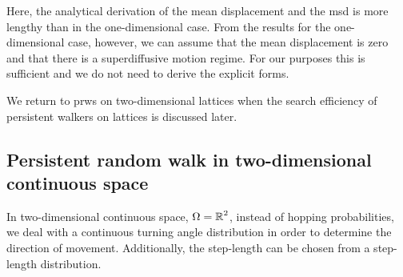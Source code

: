 Here, the analytical derivation of the mean displacement and the \ac{msd} is more lengthy than in the one-dimensional case. From the results for the one-dimensional case, however, we can assume that the mean displacement is zero and that there is a superdiffusive motion regime. For our purposes this is sufficient and we do not need to derive the explicit forms.

We return to \acp{prw} on two-dimensional lattices when the search efficiency of persistent walkers on lattices is discussed later.

\subsection{Persistent random walk in two-dimensional continuous space}
In two-dimensional continuous space, \ie $\Omega = \operatorname{\mathbb{R}}^2$, instead of hopping probabilities, we deal with a continuous turning angle distribution in order to determine the direction of movement. Additionally, the step-length can be chosen from a step-length distribution.

